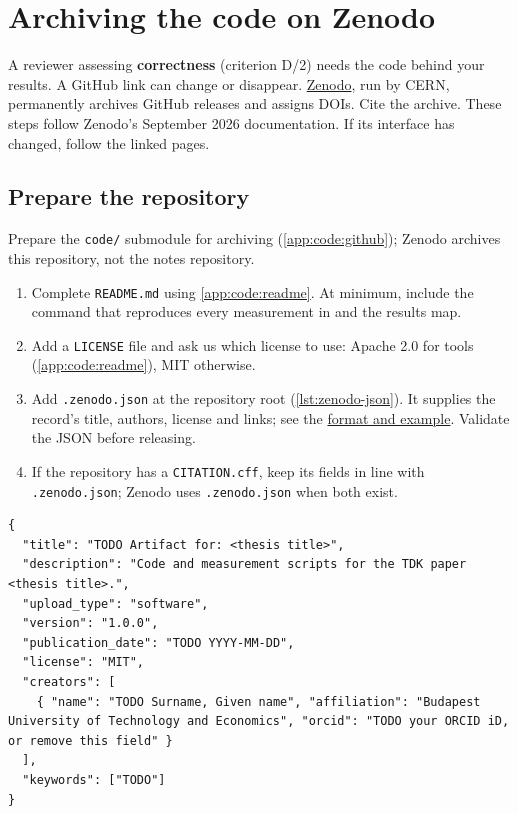 \chapter{Archiving the code on Zenodo}\label{app:zenodo}
A reviewer assessing \textbf{correctness} (criterion D/2) needs the code behind your results. A GitHub link can change or disappear.
\href{https://zenodo.org/}{Zenodo}, run by CERN, permanently archives GitHub releases and assigns DOIs. Cite the archive.
These steps follow Zenodo's September 2026 documentation. If its interface has changed, follow the linked pages.

\section{Prepare the repository}
Prepare the \texttt{code/} submodule for archiving (\cref{app:code:github}); Zenodo archives this repository, not the notes repository.
\begin{enumerate}
  \item Complete \texttt{README.md} using \cref{app:code:readme}. At minimum, include the command that reproduces every measurement in  and the results map.
  \item Add a \texttt{LICENSE} file and ask us which license to use: Apache 2.0 for tools (\cref{app:code:readme}), MIT otherwise.
  \item Add \texttt{.zenodo.json} at the repository root (\cref{lst:zenodo-json}). It supplies the record's title, authors, license and links; see the \href{https://help.zenodo.org/docs/github/describe-software/zenodo-json/}{format and example}. Validate the JSON before releasing.
  \item If the repository has a \texttt{CITATION.cff}, keep its fields in line with \texttt{.zenodo.json}; Zenodo uses \texttt{.zenodo.json} when both exist.
\end{enumerate}

\begin{listing}[!ht]
\begin{verbatim}
{
  "title": "TODO Artifact for: <thesis title>",
  "description": "Code and measurement scripts for the TDK paper <thesis title>.",
  "upload_type": "software",
  "version": "1.0.0",
  "publication_date": "TODO YYYY-MM-DD",
  "license": "MIT",
  "creators": [
    { "name": "TODO Surname, Given name", "affiliation": "Budapest University of Technology and Economics", "orcid": "TODO your ORCID iD, or remove this field" }
  ],
  "keywords": ["TODO"]
}
\end{verbatim}
\caption{A minimal \texttt{.zenodo.json}.}\label{lst:zenodo-json}
\end{listing}

